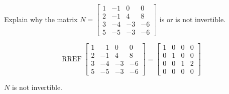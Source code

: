 
\begin{exerciseStatement}


Explain why the matrix \(N= \left[\begin{array}{cccc}
1 & -1 & 0 & 0 \\
2 & -1 & 4 & 8 \\
3 & -4 & -3 & -6 \\
5 & -5 & -3 & -6
\end{array}\right] \) is or is not invertible.


\end{exerciseStatement}
    
\begin{exerciseAnswer} 


\[\operatorname{RREF} \left[\begin{array}{cccc}
1 & -1 & 0 & 0 \\
2 & -1 & 4 & 8 \\
3 & -4 & -3 & -6 \\
5 & -5 & -3 & -6
\end{array}\right] = \left[\begin{array}{cccc}
1 & 0 & 0 & 0 \\
0 & 1 & 0 & 0 \\
0 & 0 & 1 & 2 \\
0 & 0 & 0 & 0
\end{array}\right] \]

\(N\) is not invertible.
\end{exerciseAnswer}
    
